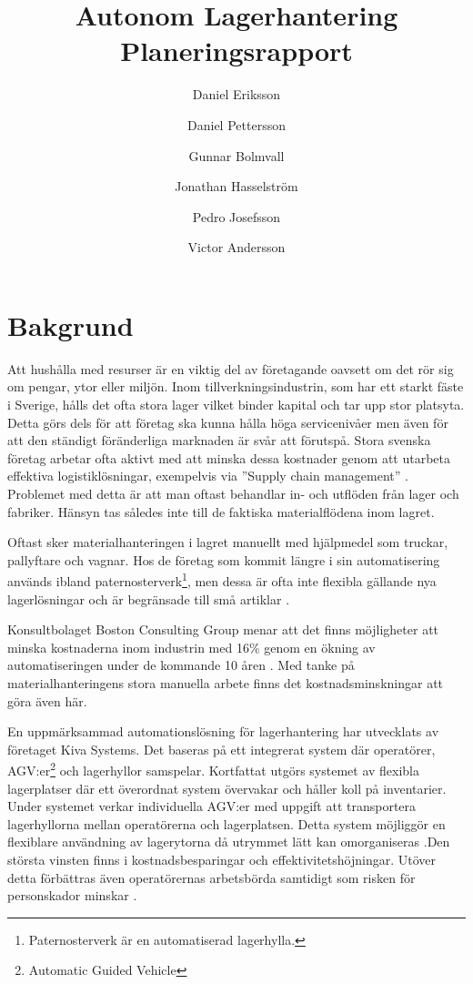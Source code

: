 \documentclass[a4paper,11pt]{article}
\author{Daniel Eriksson \and Daniel Pettersson \and Gunnar Bolmvall 
\and Jonathan Hasselström \and Pedro Josefsson \and Victor Andersson}
\title{Autonom Lagerhantering \\ Planeringsrapport}
\begin{document}
\maketitle


\section{Bakgrund}
Att hushålla med resurser är en viktig del av företagande oavsett om det
rör sig om pengar, ytor eller miljön. Inom tillverkningsindustrin, som har
ett starkt fäste i Sverige, hålls det ofta stora lager vilket binder
kapital och tar upp stor platsyta. Detta görs dels för att företag ska
kunna hålla höga servicenivåer men även för att den ständigt föränderliga
marknaden är svår att förutspå. Stora svenska företag arbetar ofta aktivt
med att minska dessa kostnader genom att utarbeta effektiva
logistiklösningar, exempelvis via ''Supply chain management'' \cite{log}.
Problemet med detta är att man oftast behandlar in- och utflöden från lager
och fabriker. Hänsyn tas således inte till de faktiska materialflödena inom
lagret.

Oftast sker materialhanteringen i lagret manuellt med hjälpmedel som
truckar, pallyftare och vagnar. Hos de företag som kommit längre i sin
automatisering används ibland paternosterverk\footnote{Paternosterverk är
en automatiserad lagerhylla.}, men dessa är ofta inte flexibla gällande nya
lagerlösningar och är begränsade till små artiklar \cite{log}.
 
Konsultbolaget Boston Consulting Group menar att det finns möjligheter att
minska kostnaderna inom industrin med 16\% genom en ökning av
automatiseringen under de kommande 10 åren \cite{bcg}. Med tanke på
materialhanteringens stora manuella arbete finns det kostnadsminskningar
att göra även här.
 
En uppmärksammad automationslösning för lagerhantering har utvecklats av
företaget Kiva Systems. Det baseras på ett integrerat system där
operatörer, AGV:er\footnote{Automatic Guided Vehicle} och lagerhyllor
samspelar. Kortfattat utgörs systemet av flexibla lagerplatser där ett
överordnat system övervakar och håller koll på inventarier. Under systemet
verkar individuella AGV:er med uppgift att transportera lagerhyllorna
mellan operatörerna och lagerplatsen. Detta system möjliggör en flexiblare
användning av lagerytorna då utrymmet lätt kan omorganiseras
\cite{kivasystems}.Den största vinsten finns i kostnadsbesparingar och
effektivitetshöjningar. Utöver detta förbättras även operatörernas
arbetsbörda samtidigt som risken för personskador minskar \cite{truckar}. 
\end{document}
